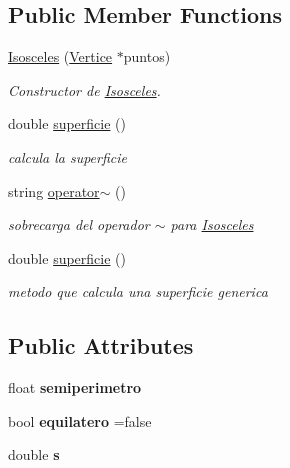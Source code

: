 \subsection*{Public Member Functions}
\begin{DoxyCompactItemize}
\item 
\hyperlink{class_isosceles_a5dc812e7ac02a71016cdc2175176608a}{Isosceles} (\hyperlink{class_vertice}{Vertice} $\ast$puntos)
\begin{DoxyCompactList}\small\item\em Constructor de \hyperlink{class_isosceles}{Isosceles}. \end{DoxyCompactList}\item 
\mbox{\label{class_isosceles_aa09c863c5ef3620e9c57b09ee380d3d1}} 
double \hyperlink{class_isosceles_aa09c863c5ef3620e9c57b09ee380d3d1}{superficie} ()
\begin{DoxyCompactList}\small\item\em calcula la superficie \end{DoxyCompactList}\item 
\mbox{\label{class_isosceles_a8998981f4d303e909964dfe90f77f445}} 
string \hyperlink{class_isosceles_a8998981f4d303e909964dfe90f77f445}{operator$\sim$} ()
\begin{DoxyCompactList}\small\item\em sobrecarga del operador $\sim$ para \hyperlink{class_isosceles}{Isosceles} \end{DoxyCompactList}\item 
\mbox{\label{class_isosceles_aa09c863c5ef3620e9c57b09ee380d3d1}} 
double \hyperlink{class_isosceles_aa09c863c5ef3620e9c57b09ee380d3d1}{superficie} ()
\begin{DoxyCompactList}\small\item\em metodo que calcula una superficie generica \end{DoxyCompactList}\end{DoxyCompactItemize}
\subsection*{Public Attributes}
\begin{DoxyCompactItemize}
\item 
\mbox{\label{class_isosceles_a108b5c836f73d45f33477f90c7a458ab}} 
float {\bfseries semiperimetro}
\item 
\mbox{\label{class_isosceles_af822b5570c97fec24a19b1e37fbacfa7}} 
bool {\bfseries equilatero} =false
\item 
\mbox{\label{class_isosceles_a664947cb8b4bc06102f840b9eeafd846}} 
double {\bfseries s}
\end{DoxyCompactItemize}
